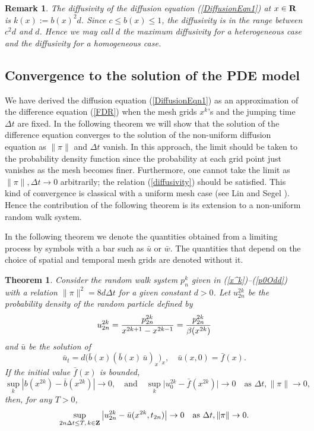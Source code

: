\documentclass[11pt]{amsart}
\def\R{{\bf R}}
\def\R{\mathbb{R}}
\def\Z{\mathbb{Z}}
\def\d{d}
\def\R{{\bf R}}
\def\Z{{\bf Z}}
\newtheorem{theorem}{Theorem}[section]
\newtheorem{remark}{Remark}[section]
\begin{document}
\begin{remark}
The diffusivity of the diffusion equation (\ref{DiffusionEqn1}) at $x\in\R$ is $k(x):=b(x)^2\d$. Since $c\le b(x)\le1$, the diffusivity is in the range between $c^2\d$ and $\d$. Hence we may call $\d$ the maximum diffusivity for a heterogeneous case and the diffusivity for a homogeneous case.
\end{remark}



\subsection{Convergence to the solution of the PDE model}

We have derived the diffusion equation (\ref{DiffusionEqn1}) as an approximation of the difference equation (\ref{FDR}) when the mesh grids $x^k$'s and the jumping time $\Delta t$ are fixed. In the following theorem we will show that the solution of the difference equation converges to the solution of the non-uniform diffusion equation as $\|\pi\|$ and $\Delta t$ vanish. In this approach, the limit should be taken to the probability density function since the probability at each grid point just vanishes as the mesh becomes finer. Furthermore, one cannot take the limit as $\|\pi\|,\Delta t\to0$ arbitrarily; the relation (\ref{diffusivity}) should be satisfied. This kind of convergence is classical with a uniform mesh case (see Lin and Segel \cite[Section 3.3]{MR982711}). Hence the contribution of the following theorem is its extension to a non-uniform random walk system.

In the following theorem we denote the quantities obtained from a limiting process by symbols with a bar such as $\bar u$ or $\bar w$. The quantities that depend on the choice of spatial and temporal mesh grids are denoted without it.
\begin{theorem}\label{thm1} Consider the random walk system $p_n^k$ given in (\ref{x^k})--(\ref{p0Odd}) with a relation $\|\pi\|^2=8\d\Delta t$ for a given constant $\d>0$. Let $u_{2n}^{2k}$ be the probability density of the random particle defined by
$$
u_{2n}^{2k}={p_{2n}^{2k}\over x^{2k+1}-x^{2k-1}}={p_{2n}^{2k}\over\beta(x^{2k})}
$$
and $\bar u$ be the solution of
\begin{equation}\label{DiffusionEqn2}
\bar u_t=\d\big(\bar b(x) (\bar b(x)\,\bar u)_x \big)_x,\quad\bar u(x,0)=\bar f(x).
\end{equation}
If the initial value $\bar f(x)$ is bounded,
\begin{equation}\label{Assumptions}
\sup_k | b(x^{2k})-\bar b(x^{2k}) | \to 0, \quad\text{and}\quad
\sup_k \Big| u^{2k}_0 -\bar f(x^{2k}) \Big| \to 0 \quad \text{as $\Delta t,\|\pi\|\to 0$,}
\end{equation}
then, for any $T>0$,
\[
\sup_{2n\Delta t\leq T,\,k\in\Z} \big| u^{2k}_{2n} - \bar u(x^{2k},t_{2n}) \big| \to 0 \quad \text{as $\Delta t, \|\pi\| \to 0.$}
\]
\end{theorem}
\end{document}
